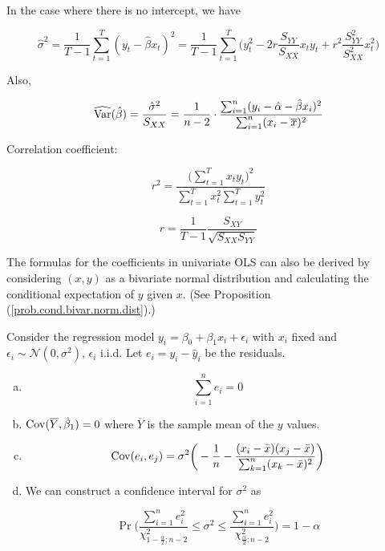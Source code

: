 In the case where there is no intercept, we have

\[
\hat{\sigma}^2 =  \frac{1}{T - 1}\sum_{t=1}^T(y_t  - \hat{\beta} x_t)^2 = \frac{1}{T - 1} \sum_{t=1}^T \bigg(y_t^2 - 2r \frac{S_{YY}}{S_{XX}}x_ty_t + r^2 \frac{S_{YY}^2}{S_{XX}^2} x_t^2 \bigg)
\]

Also,

\[
\widehat{\Var}(\hat{\beta}) = \frac{\hat{\sigma}^2}{S_{XX}} = \frac{1}{n - 2} \cdot \frac{ \sum_{i=1}^n(y_i - \hat{\alpha} - \hat{\beta} x_i)^2 }{\sum_{i=1}^n (x_i - \overline{x})^2 }
\]

Correlation coefficient:

\[
r^2 =  \frac{\big(\sum_{t=1}^T x_t y_t \big)^2}{\sum_{t=1}^T x_t^2 \sum_{t=1}^T y_t^2 }
\]

\[
r = \frac{1}{T-1} \frac{S_{XY}}{\sqrt{S_{XX}S_{YY}}}
\]

\begin{remark}The formulas for the coefficients in univariate OLS can also be derived by considering \((x, y)\) as a bivariate normal distribution and calculating the conditional expectation of \(y\) given \(x\). (See Proposition (\ref{prob.cond.bivar.norm.dist}).)\end{remark}

\begin{proposition} Consider the regression model \(y_i = \beta_0 + \beta_1 x_i + \epsilon_i\) with \(x_i\) fixed and \(\epsilon_i \sim \mathcal{N}(0, \sigma^2)\), \(\epsilon_i\) i.i.d. Let \(e_i = y_i - \hat{y}_i\) be the residuals.

\begin{enumerate}[(a)]

\item 

\[
\sum_{i=1}^n e_i = 0
\]

\item \(\Cov(\overline{Y}, \hat{\beta}_1) =0\) where \(\overline{Y}\) is the sample mean of the \(y\) values.


\item 

\[
\Cov(e_i, e_j)  = \sigma^2\bigg(-\frac{1}{n} - \frac{ (x_i -\bar{x})(x_j - \bar{x})}{\sum_{k=1}^n(x_k - \bar{x})^2} \bigg)
\]

\item We can construct a confidence interval for \(\sigma^2\) as 

\[
 \Pr \bigg( \frac{\sum_{i=1}^n e_i^2}{\chi_{1 - \frac{\alpha}{2}; n-2}^2}  \leq \sigma^2  \leq  \frac{\sum_{i=1}^n e_i^2}{\chi_{\frac{\alpha}{2}; n-2}^2}  \bigg) = 1 - \alpha 
\]

\end{enumerate}

\end{proposition}


